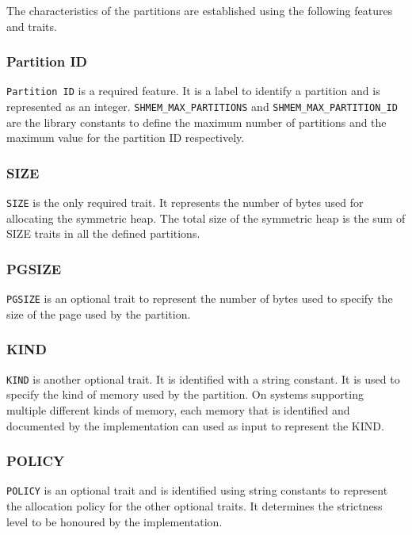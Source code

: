 The characteristics of the partitions are established using the
following features and traits.

\subsubsection{Partition ID} \texttt{Partition ID} is a required
feature. It is a label to identify a partition and is represented
as an integer. \texttt{SHMEM\_MAX\_PARTITIONS} and
\texttt{SHMEM\_MAX\_PARTITION\_ID} are the library constants to
define the maximum number of partitions and the maximum value for
the partition ID respectively.

\subsubsection{SIZE} \texttt{SIZE} is the only required trait. It
represents the number of bytes used for allocating the symmetric
heap. The total size of the symmetric heap is %
the sum of SIZE traits in all the defined partitions.

\subsubsection{PGSIZE} \texttt{PGSIZE} is an optional trait to
represent the number of bytes used to specify the size of the
page used by the partition.

\subsubsection{KIND} \texttt{KIND} is another optional trait.
It is identified with a string constant. It is used to specify
the kind of memory used by the partition. On systems supporting
multiple different kinds of memory, each memory that is identified
and documented by the implementation can used as input to represent
the KIND.

\subsubsection{POLICY} \texttt{POLICY} is an optional trait and
is identified using string constants to represent the %
allocation policy for the other optional traits. It determines
the strictness level to be honoured by the implementation.

